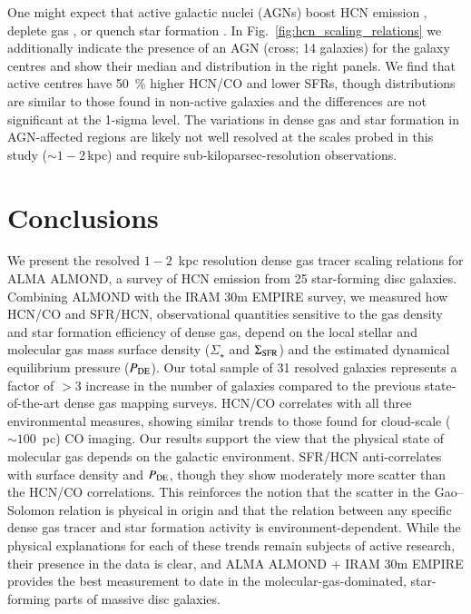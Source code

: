 \documentclass[letter, longauth]{aa} %
\begin{document}
One might expect that active galactic nuclei (AGNs) boost HCN emission \citep[e.g.][]{Goldsmith2018, Matsushita2015}, deplete gas \citep[e.g.][]{Ellison2021}, or quench star formation \citep[e.g.][]{Nelson2019}.
In Fig.~\ref{fig:hcn_scaling_relations} we additionally indicate the presence of an AGN (cross; 14 galaxies) for the galaxy centres and show their median and distribution in the right panels.
We find that active centres have \SI{50}{\percent} higher HCN/CO and lower SFRs, though distributions are similar to those found in non-active galaxies and the differences are not significant at the 1-sigma level.
The variations in dense gas and star formation in AGN-affected regions are likely not well resolved at the scales probed in this study  ($\sim 1-2\,$kpc) and require sub-kiloparsec-resolution observations.


\section{Conclusions}
\label{sec:conclusions}

We present the resolved $1{-}2$~kpc resolution dense gas tracer scaling relations for ALMA ALMOND, a survey of HCN emission from 25 star-forming disc galaxies. 
Combining ALMOND with the IRAM 30m EMPIRE survey, we measured how HCN/CO and SFR/HCN, observational quantities sensitive to the gas density and star formation efficiency of dense gas, depend on the local stellar and molecular gas mass surface density ($\Sigma_\star$ and $\Sigma_{\rm SFR}$) and the estimated dynamical equilibrium pressure ($P_{\rm DE}$). 
Our total sample of 31 resolved galaxies represents a factor of $>3$ increase in the number of galaxies compared to the previous state-of-the-art dense gas mapping surveys.
HCN/CO correlates with all three environmental measures, showing similar trends to those found for cloud-scale ($\sim 100$~pc) CO imaging. 
Our results support the view that the physical state of molecular gas depends on the galactic environment. SFR/HCN anti-correlates with surface density and $P_{\rm DE}$, though they show moderately more scatter than the HCN/CO correlations. This reinforces the notion that the scatter in the Gao--Solomon relation is physical in origin and that the relation between any specific dense gas tracer and star formation activity is environment-dependent. While the physical explanations for each of these trends remain subjects of active research, their presence in the data is clear, and ALMA ALMOND + IRAM 30m EMPIRE provides the best measurement to date in the molecular-gas-dominated, star-forming parts of massive disc galaxies.
\end{document}
